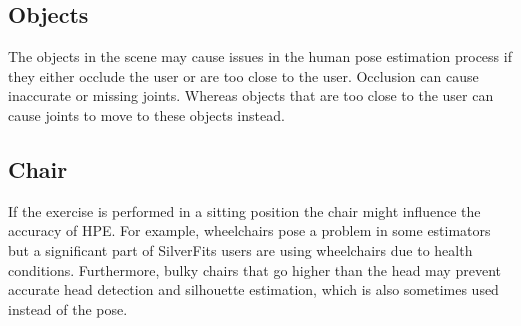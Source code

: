 \subsection{Objects}

The objects in the scene may cause issues in the human pose estimation process if they either occlude the user or are too close to the user. Occlusion can cause inaccurate or missing joints. Whereas objects that are too close to the user can cause joints to move to these objects instead.

\subsection{Chair}

If the exercise is performed in a sitting position the chair might influence the accuracy of HPE. For example, wheelchairs pose a problem in some estimators but a significant part of SilverFits users are using wheelchairs due to health conditions. Furthermore, bulky chairs that go higher than the head may prevent accurate head detection and silhouette estimation, which is also sometimes used instead of the pose.